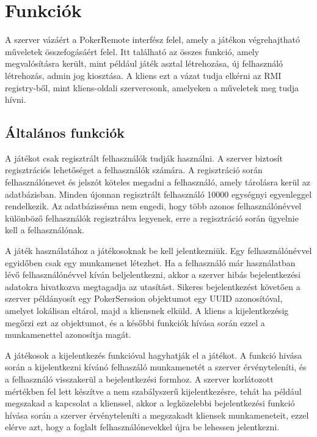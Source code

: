 \section{Funkciók}
A szerver vázáért a PokerRemote interfész felel, amely a játékon végrehajtható műveletek összefogásáért felel. Itt található az összes funkció, amely megvalósításra került, mint például játék asztal létrehozása, új felhasználó létrehozás, admin jog kiosztása. A kliens ezt a vázat tudja elkérni az RMI registry-ből, mint kliens-oldali szervercsonk, amelyeken a műveletek meg tudja hívni.
\subsection{Általános funkciók}

A játékot csak regisztrált felhasználók tudják használni. A szerver biztosít regisztrációs lehetőséget a felhasználók számára. A regisztráció során felhasználónevet és jelszót köteles megadni a felhasználó, amely tárolásra kerül az adatbázisban. Minden újonnan regisztrált felhasználó 10000 egységnyi egyenleggel rendelkezik. Az adatbázisséma nem engedi, hogy több azonos felhasználónévvel különböző felhasználók regisztrálva legyenek, erre a regisztráció során ügyelnie kell a felhasználónak.

A játék használatához a játékosoknak be kell jelentkezniük. Egy felhasználónévvel egyidőben csak egy munkamenet létezhet. Ha a felhasználó már használatban lévő felhasználónévvel kíván beljelentkezni, akkor a szerver hibás bejelentkezési adatokra hivatkozva megtagadja az utasítást. Sikeres bejelentkezést követően a szerver példányosít egy PokerSerssion objektumot egy UUID \cite{uuid} azonosítóval, amelyet lokálisan eltárol, majd a kliensnek elküld. A kliens a kijelentkezésig megőrzi ezt az objektumot, és a későbbi funkciók hívása során ezzel a munkamenettel azonosítja magát.

A játékosok a kijelentkezés funkcióval hagyhatják el a játékot. A funkció hivása során a kijelentkezni kívánó felhaszáló munkamenetét a szerver érvényteleníti, és a felhasználó visszakerül a bejelentkezési formhoz. A szerver korlátozott mértékben fel lett készítve a nem szabályszerű kijelentkezésre, tehát ha például megszakad a kapcsolat a klienssel, akkor a legközelebbi bejelentkezési funkció hívása során a szerver érvényteleníti a megszakadt kliensek munkameneteit, ezzel elérve azt, hogy a foglalt felhasználónevekkel újra be lehessen jelentkezni.

